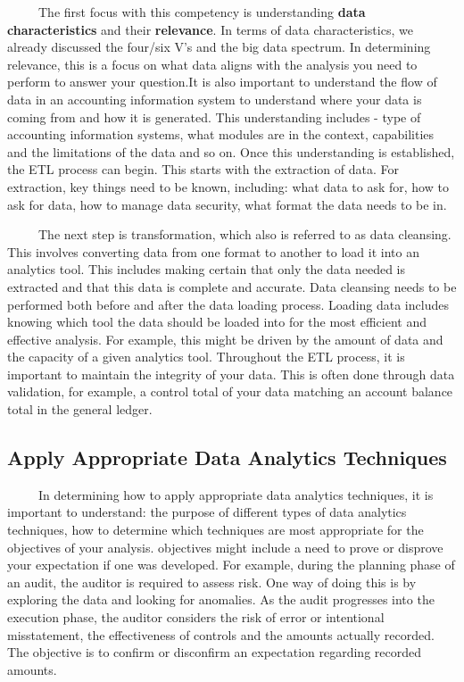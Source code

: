\documentclass[
  letterpaper,
  DIV=11,
  numbers=noendperiod]{scrreprt}
\begin{document}
~~~~~The first focus with this competency is understanding \textbf{data
characteristics} and their \textbf{relevance}. In terms of data
characteristics, we already discussed the four/six V's and the big data
spectrum. In determining relevance, this is a focus on what data aligns
with the analysis you need to perform to answer your question.It is also
important to understand the flow of data in an accounting information
system to understand where your data is coming from and how it is
generated. This understanding includes - type of accounting information
systems, what modules are in the context, capabilities and the
limitations of the data and so on. Once this understanding is
established, the ETL process can begin. This starts with the extraction
of data. For extraction, key things need to be known, including: what
data to ask for, how to ask for data, how to manage data security, what
format the data needs to be in.

~~~~~The next step is transformation, which also is referred to as data
cleansing. This involves converting data from one format to another to
load it into an analytics tool. This includes making certain that only
the data needed is extracted and that this data is complete and
accurate. Data cleansing needs to be performed both before and after the
data loading process. Loading data includes knowing which tool the data
should be loaded into for the most efficient and effective analysis. For
example, this might be driven by the amount of data and the capacity of
a given analytics tool. Throughout the ETL process, it is important to
maintain the integrity of your data. This is often done through data
validation, for example, a control total of your data matching an
account balance total in the general ledger.

\subsection{Apply Appropriate Data Analytics
Techniques}\label{apply-appropriate-data-analytics-techniques}

~~~~~In determining how to apply appropriate data analytics techniques,
it is important to understand: the purpose of different types of data
analytics techniques, how to determine which techniques are most
appropriate for the objectives of your analysis. objectives might
include a need to prove or disprove your expectation if one was
developed. For example, during the planning phase of an audit, the
auditor is required to assess risk. One way of doing this is by
exploring the data and looking for anomalies. As the audit progresses
into the execution phase, the auditor considers the risk of error or
intentional misstatement, the effectiveness of controls and the amounts
actually recorded. The objective is to confirm or disconfirm an
expectation regarding recorded amounts.
\end{document}
